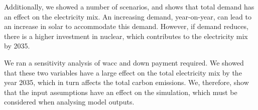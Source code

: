 Additionally, we showed a number of scenarios, and shows that total demand has an effect on the electricity mix. An increasing demand, year-on-year, can lead to an increase in solar to accommodate this demand. However, if demand reduces, there is a higher investment in nuclear, which contributes to the electricity mix by 2035.

We ran a sensitivity analysis of \acrfull{wacc} and down payment required. We showed that these two variables have a large effect on the total electricity mix by the year 2035, which in turn affects the total carbon emissions. We, therefore, show that the input assumptions have an effect on the simulation, which must be considered when analysing model outputs.


















